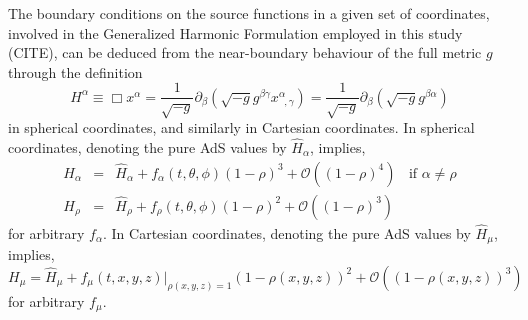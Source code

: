 \documentclass[12pt]{iopart} %
\begin{document}
The boundary conditions on the source functions in a given set of coordinates, involved in the Generalized Harmonic Formulation employed in this study (CITE), can be deduced from the near-boundary behaviour of the full metric $g$ through the definition 
\begin{equation}\label{eq:defsoufunsph}
H^\alpha \equiv \Box x^\alpha = \frac{1}{\sqrt{-g}}\partial_\beta (\sqrt{-g}g^{\beta\gamma}x^\alpha_{\;\;,\gamma})=\frac{1}{\sqrt{-g}}\partial_\beta (\sqrt{-g}g^{\beta\alpha})
\end{equation}
in spherical coordinates, and similarly in Cartesian coordinates. 
In spherical coordinates, denoting the pure AdS values by $\hat{H}_\alpha$,  implies,
\begin{eqnarray}\label{eq:sphbouncondsoufunc}
H_\alpha&=&\hat{H}_\alpha+f_\alpha(t,\theta,\phi)(1-\rho)^3+\mathcal{O}((1-\rho)^4) \;\; \textrm{ if $\alpha\neq\rho$} \\ \nonumber
H_\rho&=&\hat{H}_\rho+f_\rho(t,\theta,\phi)(1-\rho)^2+\mathcal{O}((1-\rho)^3)
\end{eqnarray}
for arbitrary $f_\alpha$.
In Cartesian coordinates,  denoting the pure AdS values by $\hat{H}_\mu$,  implies,
\begin{equation}\label{eq:carbouncondsoufun}
H_\mu=\hat{H}_\mu+f_\mu(t,x,y,z)|_{\rho(x,y,z)=1}(1-\rho(x,y,z))^2+\mathcal{O}((1-\rho(x,y,z))^3)
\end{equation}
for arbitrary $f_\mu$.




\end{document}
